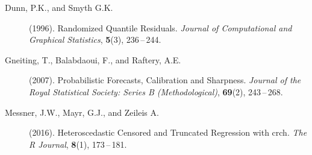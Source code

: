 \documentclass[twoside]{report}
\begin{document}


\begin{description}
    \item [Dunn, P.K., and Smyth G.K.] (1996).
        Randomized Quantile Residuals.
        {\it Journal of Computational and Graphical Statistics},
        {\bf 5}(3), 236\,--\,244.
\item[Gneiting, T., Balabdaoui, F., and Raftery, A.E.] (2007).
    Probabilistic Forecasts, Calibration and Sharpness.
    {\it Journal of the Royal Statistical Society: Series B (Methodological)},
    {\bf 69}(2), 243\,--\,268.
\item [Messner, J.W., Mayr, G.J., and Zeileis A.] (2016).
    Heteroscedastic Censored and Truncated Regression with crch.
    {\it The R Journal},
    {\bf 8}(1), 173\,--\,181.
\end{description}
\end{document}
